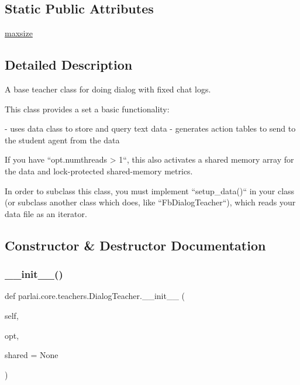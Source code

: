 \subsection*{Static Public Attributes}
\begin{DoxyCompactItemize}
\item 
\hyperlink{classparlai_1_1core_1_1teachers_1_1DialogTeacher_aa0637cf3392baf2e9c965de7ffc812ac}{maxsize}
\end{DoxyCompactItemize}


\subsection{Detailed Description}
\begin{DoxyVerb}A base teacher class for doing dialog with fixed chat logs.

This class provides a set a basic functionality:

- uses data class to store and query text data
- generates action tables to send to the student agent from the data

If you have ``opt.numthreads > 1``, this also activates a shared memory
array for the data and lock-protected shared-memory metrics.

In order to subclass this class, you must implement ``setup_data()`` in
your class (or subclass another class which does, like
``FbDialogTeacher``), which reads your data file as an iterator.
\end{DoxyVerb}
 

\subsection{Constructor \& Destructor Documentation}
\mbox{\label{classparlai_1_1core_1_1teachers_1_1DialogTeacher_a9385b9ae914ef84be6b54107811b202b}} 
\subsubsection{\texorpdfstring{\+\_\+\+\_\+init\+\_\+\+\_\+()}{\_\_init\_\_()}}
{\footnotesize\ttfamily def parlai.\+core.\+teachers.\+Dialog\+Teacher.\+\_\+\+\_\+init\+\_\+\+\_\+ (\begin{DoxyParamCaption}\item[{}]{self,  }\item[{}]{opt,  }\item[{}]{shared = {\ttfamily None} }\end{DoxyParamCaption})}



